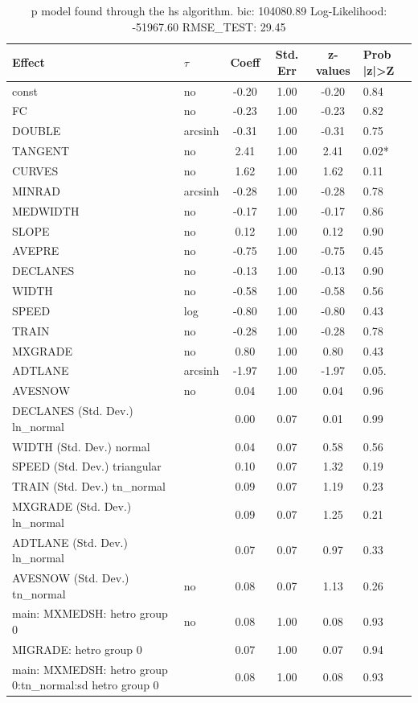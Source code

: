 \begin{table}
	\caption{p model found through the hs algorithm. bic: 104080.89 Log-Likelihood: -51967.60 RMSE_TEST: 29.45}
	\begin{center}
		\begin{tabular}{|l|l|c|c|c|l|}
			\hline
			Effect & $\tau$ & Coeff & Std. Err & z-values & Prob |z|>Z \\
			\hline
			const & no & -0.20 & 1.00 & -0.20 & 0.84 \\
			\hline
			FC & no & -0.23 & 1.00 & -0.23 & 0.82 \\
			\hline
			DOUBLE & arcsinh & -0.31 & 1.00 & -0.31 & 0.75 \\
			\hline
			TANGENT & no & 2.41 & 1.00 & 2.41 & 0.02* \\
			\hline
			CURVES & no & 1.62 & 1.00 & 1.62 & 0.11 \\
			\hline
			MINRAD & arcsinh & -0.28 & 1.00 & -0.28 & 0.78 \\
			\hline
			MEDWIDTH & no & -0.17 & 1.00 & -0.17 & 0.86 \\
			\hline
			SLOPE & no & 0.12 & 1.00 & 0.12 & 0.90 \\
			\hline
			AVEPRE & no & -0.75 & 1.00 & -0.75 & 0.45 \\
			\hline
			DECLANES & no & -0.13 & 1.00 & -0.13 & 0.90 \\
			\hline
			WIDTH & no & -0.58 & 1.00 & -0.58 & 0.56 \\
			\hline
			SPEED & log & -0.80 & 1.00 & -0.80 & 0.43 \\
			\hline
			TRAIN & no & -0.28 & 1.00 & -0.28 & 0.78 \\
			\hline
			MXGRADE & no & 0.80 & 1.00 & 0.80 & 0.43 \\
			\hline
			ADTLANE & arcsinh & -1.97 & 1.00 & -1.97 & 0.05. \\
			\hline
			AVESNOW & no & 0.04 & 1.00 & 0.04 & 0.96 \\
			\hline
			DECLANES (Std. Dev.) ln_normal &  & 0.00 & 0.07 & 0.01 & 0.99 \\
			\hline
			WIDTH (Std. Dev.) normal &  & 0.04 & 0.07 & 0.58 & 0.56 \\
			\hline
			SPEED (Std. Dev.) triangular &  & 0.10 & 0.07 & 1.32 & 0.19 \\
			\hline
			TRAIN (Std. Dev.) tn_normal &  & 0.09 & 0.07 & 1.19 & 0.23 \\
			\hline
			MXGRADE (Std. Dev.) ln_normal &  & 0.09 & 0.07 & 1.25 & 0.21 \\
			\hline
			ADTLANE (Std. Dev.) ln_normal &  & 0.07 & 0.07 & 0.97 & 0.33 \\
			\hline
			AVESNOW (Std. Dev.) tn_normal & no & 0.08 & 0.07 & 1.13 & 0.26 \\
			\hline
			main: MXMEDSH: hetro group 0 & no & 0.08 & 1.00 & 0.08 & 0.93 \\
			\hline
			MIGRADE: hetro group 0 &  & 0.07 & 1.00 & 0.07 & 0.94 \\
			\hline
			main: MXMEDSH: hetro group 0:tn_normal:sd  hetro group 0 &  & 0.08 & 1.00 & 0.08 & 0.93 \\
			\hline
		\end{tabular}
	\end{center}
\end{table}
